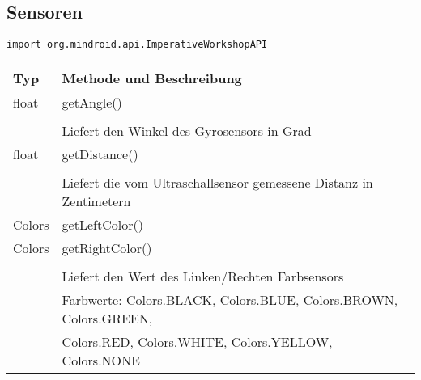 		\newpage
	\subsection{Sensoren}
			\begin{center}\texttt{import org.mindroid.api.ImperativeWorkshopAPI}\end{center}
		\begin{table}[htbp]
		\begin{tabular}{|p{} p{}|}
		\hline
		\textbf{Typ} & \textbf{Methode und Beschreibung} \\ \hline
		float & getAngle() \\ 
		&\\
		& Liefert den Winkel des Gyrosensors in Grad\\ \hline
		float & getDistance() \\ 
		&\\
		& Liefert die vom Ultraschallsensor gemessene Distanz in Zentimetern\\ \hline		
		Colors & getLeftColor() \\ 
		Colors & getRightColor() \\
		&\\
		& Liefert den Wert des Linken/Rechten Farbsensors\\ 
		& Farbwerte: Colors.BLACK, Colors.BLUE, Colors.BROWN, Colors.GREEN, \\ &Colors.RED, Colors.WHITE, Colors.YELLOW, Colors.NONE\\ \hline
		\end{tabular}
		\end{table}

